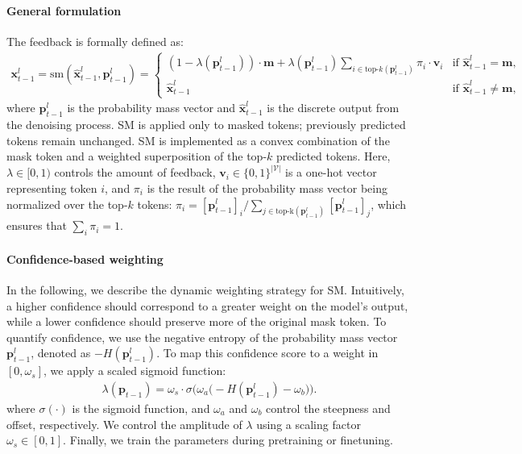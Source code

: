 \documentclass{article}
\begin{document}
\paragraph{General formulation}
The feedback is formally defined as:
\begin{align*}
    \mathbf{x}^l_{t-1}=\text{sm}(\mathbf{\hat{x}}^l_{t-1}, \mathbf{p}^l_{t-1}) = \begin{cases} \left(1-\lambda(\mathbf{p}^l_{t-1})\right)\cdot\mathbf{m} + \lambda(\mathbf{p}^l_{t-1}) \sum_{i\in \text{top-$k$}(\mathbf{p}^l_{t-1})} \pi_i \cdot \mathbf{v}_i & \text{if } \mathbf{\hat{x}}^l_{t-1} = \mathbf{m}, \\
\mathbf{\hat{x}}^l_{t-1} & \text{if } \mathbf{\hat{x}}^l_{t-1} \neq \mathbf{m}, 
\end{cases}
\end{align*}
where $\mathbf{p}^l_{t-1}$ is the probability mass vector and $\mathbf{\hat{x}}^l_{t-1}$ is the discrete output from the denoising process. 
% 
SM is applied only to masked tokens; previously predicted tokens remain unchanged. 
% 
SM is implemented as a convex combination of the mask token and a weighted superposition of the top-$k$ predicted tokens. 
Here, $\lambda \in [0,1)$ controls the amount of feedback, $\mathbf{v}_i\in \{0,1\}^{|\mathcal{V}|}$ is a one-hot vector representing token $i$, and $\pi_i$ is the result of the probability mass vector being normalized over the top-$k$ tokens: $\pi_i = [\mathbf{p}^l_{t-1}]_i / \sum_{j \in \text{top-k}(\mathbf{p}^l_{t-1})} [\mathbf{p}^l_{t-1}]_j$, which ensures that $\sum_i \pi_i = 1$.

\paragraph{Confidence-based weighting}
\label{sec:confidence_scaling}
In the following, we describe the dynamic weighting strategy for SM.
% 
Intuitively, a higher confidence should correspond to a greater weight on the model's output, while a lower confidence should preserve more of the original mask token.
% 
To quantify confidence, we use the negative entropy of the probability mass vector $\mathbf{p}^l_{t-1}$, denoted as $-H(\mathbf{p}^l_{t-1})$.
% 
To map this confidence score to a weight in $[0, \omega_s]$, we apply a scaled sigmoid function:
\begin{align}
    \lambda (\mathbf{p}_{t-1}) = \omega_s\cdot \sigma \Big(\omega_a\big(-H(\mathbf{p}^l_{t-1})-\omega_b\big)\Big).
    \label{eq:confidence_scaling}
\end{align}
% 
 where $\sigma(\cdot)$ is the sigmoid function, and $\omega_a$ and $\omega_b$ control the steepness and offset, respectively. 
%
We control the amplitude of $\lambda$ using a scaling factor $\omega_s\in [0,1]$. 
% 
Finally, we train the parameters during pretraining or finetuning. 
\end{document}
